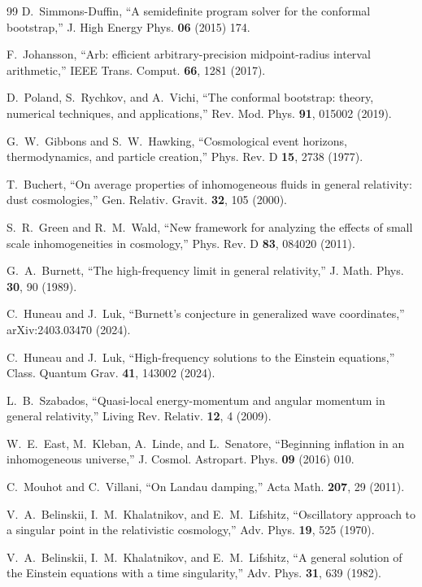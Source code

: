 \documentclass[11pt,letterpaper]{article}
\begin{document}
\begin{thebibliography}{99}
 D.~Simmons-Duffin, ``A semidefinite program solver for the conformal bootstrap,'' J. High Energy Phys. \textbf{06} (2015) 174.

 F.~Johansson, ``Arb: efficient arbitrary-precision midpoint-radius interval arithmetic,'' IEEE Trans. Comput. \textbf{66}, 1281 (2017).

 D.~Poland, S.~Rychkov, and A.~Vichi, ``The conformal bootstrap: theory, numerical techniques, and applications,'' Rev. Mod. Phys. \textbf{91}, 015002 (2019).

 G.~W.~Gibbons and S.~W.~Hawking, ``Cosmological event horizons, thermodynamics, and particle creation,'' Phys. Rev. D \textbf{15}, 2738 (1977).

 T.~Buchert, ``On average properties of inhomogeneous fluids in general relativity: dust cosmologies,'' Gen. Relativ. Gravit. \textbf{32}, 105 (2000).

 S.~R.~Green and R.~M.~Wald, ``New framework for analyzing the effects of small scale inhomogeneities in cosmology,'' Phys. Rev. D \textbf{83}, 084020 (2011).

 G.~A.~Burnett, ``The high-frequency limit in general relativity,'' J. Math. Phys. \textbf{30}, 90 (1989).

 C.~Huneau and J.~Luk, ``Burnett's conjecture in generalized wave coordinates,'' arXiv:2403.03470 (2024).

 C.~Huneau and J.~Luk, ``High-frequency solutions to the Einstein equations,'' Class. Quantum Grav. \textbf{41}, 143002 (2024).

 L.~B.~Szabados, ``Quasi-local energy-momentum and angular momentum in general relativity,'' Living Rev. Relativ. \textbf{12}, 4 (2009).

 W.~E.~East, M.~Kleban, A.~Linde, and L.~Senatore, ``Beginning inflation in an inhomogeneous universe,'' J. Cosmol. Astropart. Phys. \textbf{09} (2016) 010.

 C.~Mouhot and C.~Villani, ``On Landau damping,'' Acta Math. \textbf{207}, 29 (2011).

 V.~A.~Belinskii, I.~M.~Khalatnikov, and E.~M.~Lifshitz, ``Oscillatory approach to a singular point in the relativistic cosmology,'' Adv. Phys. \textbf{19}, 525 (1970).

 V.~A.~Belinskii, I.~M.~Khalatnikov, and E.~M.~Lifshitz, ``A general solution of the Einstein equations with a time singularity,'' Adv. Phys. \textbf{31}, 639 (1982).


\end{thebibliography}
\end{document}
